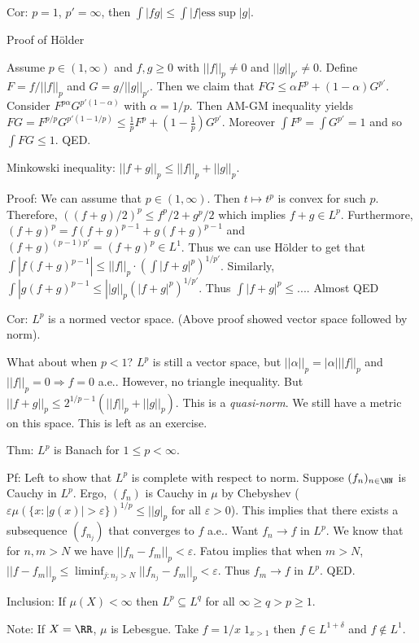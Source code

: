 \documentclass{../uva7310}
\begin{document}
Cor: $p=1$, $p'=\infty$, then $\int |fg|\leq \int |f|\text{ess}\sup |g|$.

Proof of H\"older

Assume $p\in(1,\infty)$ and $f,g\geq 0$ with $||f||_p\neq 0$ and $||g||_{p'}\neq 0$. Define $F=f/||f||_p$ and $G=g/||g||_{p'}$.
Then we claim that $FG\leq \alpha F^p+(1-\alpha) G^{p'}$. Consider $F^{p\alpha}G^{p'(1-\alpha)}$ with $\alpha=1/p$. Then
AM-GM inequality yields $FG=F^{p/p}G^{p'(1-1/p)}\leq \frac{1}{p}F^p+(1-\frac{1}{p}) G^{p'}$.
Moreover $\int F^p=\int G^{p'}=1$ and so $\int FG\leq 1$. QED.

Minkowski inequality: $||f+g||_p\leq ||f||_p+||g||_p$.

Proof: We can assume that $p\in(1,\infty)$. Then $t\mapsto t^p$ is convex for such $p$. Therefore, $((f+g)/2)^p\leq f^p/2+g^p/2$
which implies $f+g\in L^p$. Furthermore, $(f+g)^p=f(f+g)^{p-1}+g(f+g)^{p-1}$ and $(f+g)^{(p-1)p'}=(f+g)^p\in L^1$. Thus we can
use H\"older to get that $\int |f(f+g)^{p-1}|\leq ||f||_p \cdot \left(\int|f+g|^p\right)^{1/p'}$. Similarly,
$\int|g(f+g)^{p-1}\leq ||g||_p\left(|f+g|^p\right)^{1/p'}$. Thus $\int |f+g|^p\leq ...$. Almost QED

Cor: $L^p$ is a normed vector space. (Above proof showed vector space followed by norm).

What about when $p<1$? $L^p$ is still a vector space, but $||\alpha||_p=|\alpha|||f||_p$ and $||f||_p=0\Rightarrow f=0$ a.e..
However, no triangle inequality. But $||f+g||_p\leq 2^{1/p-1} (||f||_p+||g||_p)$. This is a \textit{quasi-norm}.
We still have a metric on this space. This is left as an exercise.

Thm: $L^p$ is Banach for $1\leq p< \infty$.

Pf: Left to show that $L^p$ is complete with respect to norm. Suppose $(f_n)_{n\in\NN}$ is Cauchy in $L^p$. Ergo,
$(f_n)$ is Cauchy in $\mu$ by Chebyshev ($\varepsilon \mu(\{x:|g(x)|>\varepsilon\})^{1/p}\leq ||g|_p$ for all $\varepsilon>0$).
This implies that there exists a subsequence $(f_{n_j})$ that converges to $f$ a.e.. Want $f_n\to f$ in $L^p$.
We know that for $n,m>N$ we have $||f_n-f_m||_p<\varepsilon$. Fatou implies that when $m>N$,
$||f-f_m||_p \leq \liminf_{j:n_j>N} ||f_{n_j}-f_m||_p<\varepsilon$. Thus $f_m\to f$ in $L^p$. QED.

Inclusion: If $\mu(X)<\infty$ then $L^p\subseteq L^q$ for all $\infty\geq q>p\geq 1$.

Note: If $X=\RR$, $\mu$ is Lebesgue. Take $f=1/x\; 1_{x>1}$ then $f\in L^{1+\delta}$ and $f\notin L^1$.
\end{document}
